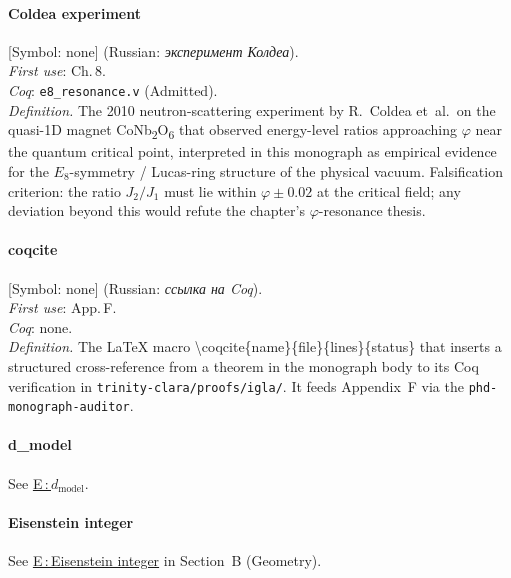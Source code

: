 \paragraph*{\textmd{\textbf{Coldea experiment}}}
\label{entry:coldea}
[Symbol: none] (Russian: \textit{эксперимент Колдеа}).\\
\textit{First use}: Ch.\,8.\\
\textit{Coq}: \texttt{e8\_resonance.v} (Admitted).\\
\textit{Definition.}
The 2010 neutron-scattering experiment by R.~Coldea et~al.\ on the
quasi-1D magnet CoNb\textsubscript{2}O\textsubscript{6} that observed
energy-level ratios approaching $\varphi$ near the quantum critical
point, interpreted in this monograph as empirical evidence for the
$E_8$-symmetry / Lucas-ring structure of the physical vacuum.
Falsification criterion: the ratio $J_2/J_1$ must lie within
$\varphi \pm 0.02$ at the critical field; any deviation beyond this
would refute the chapter's $\varphi$-resonance thesis.

\paragraph*{\textmd{\textbf{coqcite}}}
\label{entry:coqcite}
[Symbol: none] (Russian: \textit{ссылка на Coq}).\\
\textit{First use}: App.\,F.\\
\textit{Coq}: none.\\
\textit{Definition.}
The LaTeX macro \textbackslash coqcite\{name\}\{file\}\{lines\}\{status\}
that inserts a structured cross-reference from a theorem in the
monograph body to its Coq verification in
\texttt{trinity-clara/proofs/igla/}.
It feeds Appendix~F via the \texttt{phd-monograph-auditor}.

\paragraph*{\textmd{\textbf{d\_model}}}
\quad See \hyperref[entry:dmodel]{E\,:\,$d_{\mathrm{model}}$}.

\paragraph*{\textmd{\textbf{Eisenstein integer}}}
\quad See \hyperref[entry:eisenstein]{E\,:\,Eisenstein integer} in
Section~B (Geometry).

